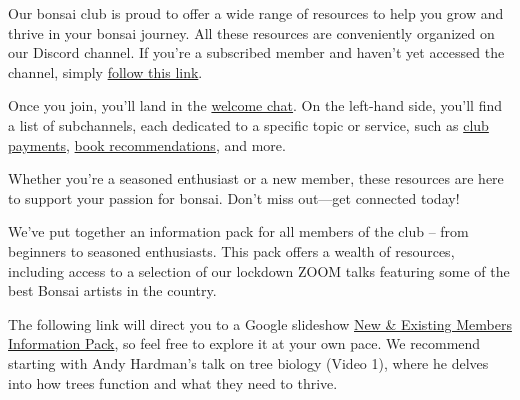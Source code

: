 \medskip
{}
\noindent  
Our bonsai club is proud to offer a wide range of resources to help you grow and thrive in your bonsai journey.
All these resources are conveniently organized on our Discord channel.
If you're a subscribed member and haven’t yet accessed the channel, simply \href{https://discord.gg/N6yka6XJ}{follow this link}.

Once you join, you'll land in the \href{https://discord.com/channels/873817545013071872/1118677826208550923}{welcome chat}.
On the left\--hand side, you'll find a list of subchannels, each dedicated to a specific topic or service, such as \href{https://discord.com/channels/873817545013071872/1039691122148130876}{club payments}, \href{https://discord.com/channels/873817545013071872/1001189937409949698}{book recommendations}, and more.

Whether you're a seasoned enthusiast or a new member, these resources are here to support your passion for bonsai.
Don't miss out---get connected today!

\medskip	
{}
\noindent
We've put together an information pack for all members of the club – from beginners to seasoned enthusiasts.
This pack offers a wealth of resources, including access to a selection of our lockdown ZOOM talks featuring some of the best Bonsai artists in the country.

The following link will direct you to a Google slideshow \href{https://docs.google.com/presentation/d/1L5SRA_ZSvnGMLbRt0CSf-Uz7BaiOfxOs7OUHMM_XrTY/edit?usp=sharing}{New \& Existing Members Information Pack}, so feel free to explore it at your own pace.
We recommend starting with Andy Hardman’s talk on tree biology (Video 1), where he delves into how trees function and what they need to thrive.

	
	
\closearticle
\clearpage

